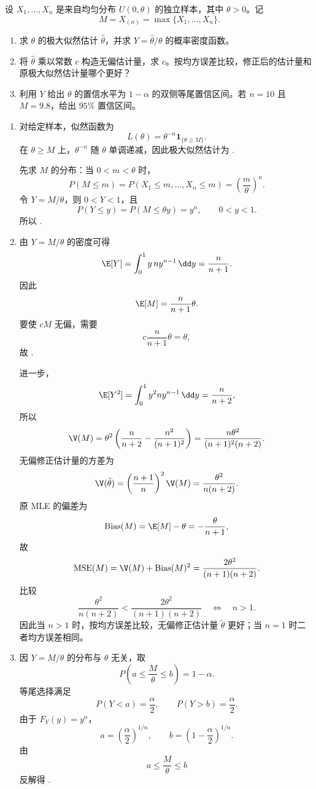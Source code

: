 \begin{question}[均匀分布端点估计]
设 $X_1,\ldots,X_n$ 是来自均匀分布 $U(0,\theta)$ 的独立样本，其中 $\theta>0$。记
\[
M=X_{(n)}=\max\{X_1,\ldots,X_n\}.
\]
\begin{enumerate}
\item 求 $\theta$ 的极大似然估计 $\hat\theta$，并求 $Y=\hat\theta/\theta$ 的概率密度函数。
\item 将 $\hat\theta$ 乘以常数 $c$ 构造无偏估计量，求 $c$。按均方误差比较，修正后的估计量和原极大似然估计量哪个更好？
\item 利用 $Y$ 给出 $\theta$ 的置信水平为 $1-\alpha$ 的双侧等尾置信区间。若 $n=10$ 且 $M=9.8$，给出 $95\%$ 置信区间。
\end{enumerate}
\begin{solution}
\begin{enumerate}
\item 对给定样本，似然函数为
\[
L(\theta)=\theta^{-n}\mathbf 1_{\{\theta\ge M\}}.
\]
在 $\theta\ge M$ 上，$\theta^{-n}$ 随 $\theta$ 单调递减，因此极大似然估计为
.

先求 $M$ 的分布：当 $0<m<\theta$ 时，
\[
P(M\le m)=P(X_1\le m,\ldots,X_n\le m)=\left(\frac{m}{\theta}\right)^n.
\]
令 $Y=M/\theta$，则 $0<Y<1$，且
\[
P(Y\le y)=P(M\le \theta y)=y^n,
\qquad 0<y<1.
\]
所以
.

\item 由 $Y=M/\theta$ 的密度可得
\[
\E[Y]=\int_0^1y\,ny^{n-1}\,\dd y=\frac{n}{n+1}.
\]
因此
\[
\E[M]=\frac{n}{n+1}\theta.
\]
要使 $cM$ 无偏，需要
\[
c\frac{n}{n+1}\theta=\theta,
\]
故
.

进一步，
\[
\E[Y^2]=\int_0^1 y^2ny^{n-1}\,\dd y=\frac{n}{n+2},
\]
所以
\[
\V(M)=\theta^2\left(\frac{n}{n+2}-\frac{n^2}{(n+1)^2}\right)
=\frac{n\theta^2}{(n+1)^2(n+2)}.
\]
无偏修正估计量的方差为
\[
\V(\tilde\theta)=\left(\frac{n+1}{n}\right)^2\V(M)
=\frac{\theta^2}{n(n+2)}.
\]
原 MLE 的偏差为
\[
\operatorname{Bias}(M)=\E[M]-\theta=-\frac{\theta}{n+1},
\]
故
\[
\operatorname{MSE}(M)=\V(M)+\operatorname{Bias}(M)^2
=\frac{2\theta^2}{(n+1)(n+2)}.
\]
比较
\[
\frac{\theta^2}{n(n+2)}<\frac{2\theta^2}{(n+1)(n+2)}
\quad\Longleftrightarrow\quad n>1.
\]
因此当 $n>1$ 时，按均方误差比较，无偏修正估计量 $\tilde\theta$ 更好；当 $n=1$ 时二者均方误差相同。

\item 因 $Y=M/\theta$ 的分布与 $\theta$ 无关，取
\[
P\left(a\le \frac{M}{\theta}\le b\right)=1-\alpha.
\]
等尾选择满足
\[
P(Y<a)=\frac{\alpha}{2},\qquad P(Y>b)=\frac{\alpha}{2}.
\]
由于 $F_Y(y)=y^n$，
\[
a=\left(\frac{\alpha}{2}\right)^{1/n},
\qquad
b=\left(1-\frac{\alpha}{2}\right)^{1/n}.
\]
由
\[
a\le \frac{M}{\theta}\le b
\]
反解得
.


\end{enumerate}
\end{solution}
\end{question}
